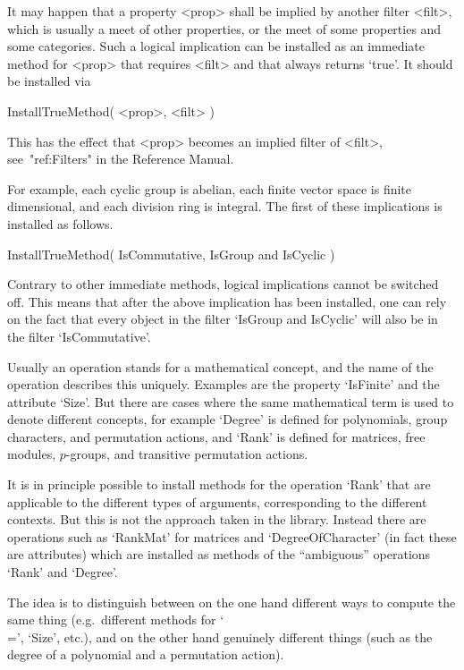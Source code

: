 
It may happen that a property <prop> shall be implied by another filter
<filt>, which is usually a meet of other properties,
or the meet of some properties and some categories.
Such a logical implication can be installed as an immediate method for
<prop> that requires <filt> and that always returns `true'.
It should be installed via

\>InstallTrueMethod( <prop>, <filt> )

This has the effect that <prop> becomes an implied filter of <filt>,
see~"ref:Filters" in the Reference Manual.

For example, each cyclic group is abelian,
each finite vector space is finite dimensional,
and each division ring is integral.
The first of these implications is installed as follows.

\begintt
    InstallTrueMethod( IsCommutative, IsGroup and IsCyclic )
\endtt

Contrary to other immediate methods,
logical implications cannot be switched off.
This means that after the above implication has been installed,
one can rely on the fact that every object in the filter
`IsGroup and IsCyclic' will also be in the filter `IsCommutative'.



Usually an operation stands for a mathematical concept,
and the name of the operation describes this uniquely.
Examples are the property `IsFinite' and the attribute `Size'.
But there are cases where the same mathematical term is used 
to denote different concepts,
for example `Degree' is defined for polynomials, group characters,
and permutation actions,
and `Rank' is defined for matrices, free modules, $p$-groups,
and transitive permutation actions.

It is in principle possible to install methods for the operation
`Rank' that are applicable to the different types of arguments,
corresponding to the different contexts.
But this is not the approach taken in the {\GAP} library.
Instead there are operations such as `RankMat' for matrices
and `DegreeOfCharacter' (in fact these are attributes)
which are installed as methods of the ``ambiguous'' operations
`Rank' and `Degree'.

The idea is to distinguish between on the one hand different ways
to compute the same thing (e.g.~different methods for `\\=', `Size', etc.),
and on the other hand genuinely different things
(such as the degree of a polynomial and a permutation action).

